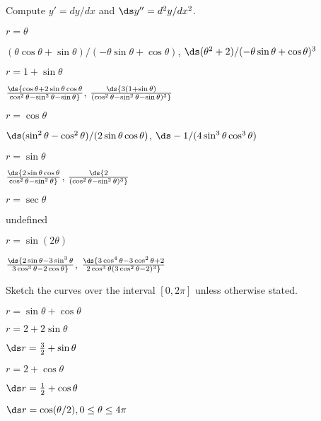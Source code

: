 \begin{exercises}

\noindent Compute $y'=dy/dx$ and $\ds y''=d^2y/dx^2$.

\twocol

\exercise $r=\theta$
\begin{answer}$(\theta\cos\theta+\sin\theta)/(-\theta\sin\theta+\cos\theta)$,
$\ds (\theta^2+2)/(-\theta\sin\theta+\cos\theta)^3$
\end{answer}

\exercise $r=1+\sin\theta$
\begin{answer} $\ds {\cos\theta+2\sin\theta\cos\theta\over
\cos^2\theta-\sin^2\theta-\sin\theta}$,
$\ds {3(1+\sin\theta)\over(\cos^2\theta-\sin^2\theta-\sin\theta)^3}$
\end{answer}

\exercise $r=\cos\theta$
\begin{answer} $\ds (\sin^2\theta-\cos^2\theta)/(2\sin\theta\cos\theta)$,
$\ds -1/(4\sin^3\theta\cos^3\theta)$
\end{answer}

\exercise $r=\sin\theta$
\begin{answer} $\ds {2\sin\theta\cos\theta\over\cos^2\theta-\sin^2\theta}$,
$\ds {2\over(\cos^2\theta-\sin^2\theta)^3}$
\end{answer}

\exercise $r=\sec\theta$
\begin{answer} undefined
\end{answer}

\exercise $r=\sin(2\theta)$
\begin{answer} $\ds {2\sin\theta-3\sin^3\theta\over3\cos^3\theta-2\cos\theta}$,
$\ds {3\cos^4\theta-3\cos^2\theta+2\over2\cos^3\theta(3\cos^2\theta-2)^3}$
\end{answer}

\endtwocol

\bigbreak
\noindent Sketch the curves over the interval $[0,2\pi]$ unless
otherwise stated.

\twocol

\exercise $r=\sin\theta+\cos\theta$

\exercise $r=2+2\sin\theta$

\exercise $\ds r={3\over2}+\sin\theta$

\exercise $r= 2+\cos\theta$

\exercise $\ds r={1\over2}+\cos\theta$

\exercise $\ds r=\cos(\theta/2), 0\le\theta\le4\pi$


\end{exercises}
